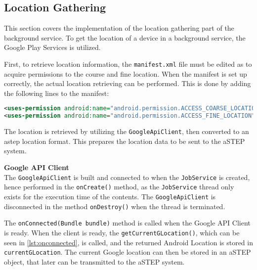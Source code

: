 \subsection{Location Gathering} \label{section:locationgathering}
This section covers the implementation of the location gathering part of the background service.
To get the location of a device in a background service, the Google Play Services is utilized.

First, to retrieve location information, the \texttt{manifest.xml} file must be edited as to acquire permissions to the course and fine location.
When the manifest is set up correctly, the actual location retrieving can be performed.
This is done by adding the following lines to the manifest:
\begin{lstlisting}[language=XML]
<uses-permission android:name="android.permission.ACCESS_COARSE_LOCATION"/>
<uses-permission android:name="android.permission.ACCESS_FINE_LOCATION"/>
\end{lstlisting}

The location is retrieved by utilizing the \texttt{GoogleApiClient}, then converted to an \gls{astep} location format.
This prepares the location data to be sent to the aSTEP system.


\textbf{Google API Client}\\
The \texttt{GoogleApiClient} is built and connected to when the \texttt{JobService} is created, hence performed in the \texttt{onCreate()} method, as the \texttt{JobService} thread only exists for the execution time of the contents.
The \texttt{GoogleApiClient} is disconnected in the method \texttt{onDestroy()} when the thread is terminated.

\iffalse
\begin{lstlisting}[caption={onCreate()},label={lst:oncreate},language=Java]
@Override
public void onCreate() {
	// Set the current Context to this
	context = this;
	// Builds the Google API Client to enable location
	buildGoogleApiClient();
	// Connects the Google API Client. It broadcasts to onConnect() when connected.
	connectApi();
}
\end{lstlisting}
\fi



The \texttt{onConnected(Bundle bundle)} method is called when the Google API Client is ready.
When the client is ready, the \texttt{getCurrentGLocation()}, which can be seen in \ref{lst:onconnected}, is called, and the returned Android Location is stored in \texttt{currentGLocation}. 
The current Google location can then be stored in an aSTEP object, that later can be transmitted to the aSTEP system.

